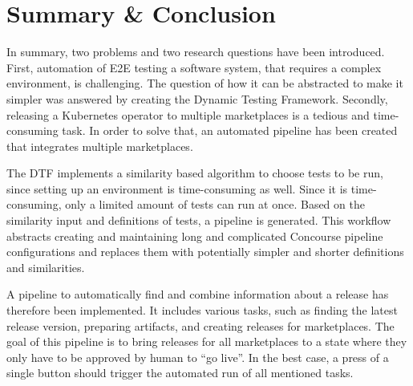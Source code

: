 \chapter{Summary \& Conclusion}\label{ch:conclusion}

In summary, two problems and two research questions have been introduced.
First, automation of E2E testing a software system, that requires a complex environment, is challenging.
The question of how it can be abstracted to make it simpler was answered by creating the Dynamic Testing Framework.
Secondly, releasing a Kubernetes operator to multiple marketplaces is a tedious and time-consuming task.
In order to solve that, an automated pipeline has been created that integrates multiple marketplaces.

The DTF implements a similarity based algorithm to choose tests to be run, since setting up an environment is time-consuming as well.
Since it is time-consuming, only a limited amount of tests can run at once.
Based on the similarity input and definitions of tests, a pipeline is generated.
This workflow abstracts creating and maintaining long and complicated Concourse pipeline configurations and replaces them with potentially simpler and shorter definitions and similarities.


A pipeline to automatically find and combine information about a release has therefore been implemented.
It includes various tasks, such as finding the latest release version, preparing artifacts, and creating releases for marketplaces.
The goal of this pipeline is to bring releases for all marketplaces to a state where they only have to be approved by human to ``go live''.
In the best case, a press of a single button should trigger the automated run of all mentioned tasks.
